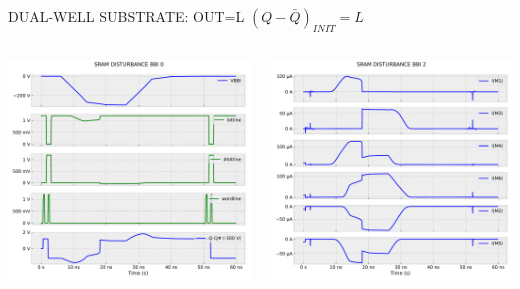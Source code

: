 
\begin{frame}{DUAL-WELL SUBSTRATE: OUT=L}
	\vspace{5mm}
	$(Q-\bar{Q})_{INIT}=L$
	\vspace{5mm}
	\begin{columns}
		\begin{column}{0.5\textwidth}
			\centering
			\includegraphics[width=\textwidth]{./figures/SRAMBBI0-300DW_q0.pdf}
		\end{column}
		\begin{column}{0.5\textwidth}
			\centering
			\includegraphics[width=\textwidth]{./figures/SRAMBBI2-300DW_q0.pdf}
		\end{column}
	\end{columns}
\end{frame}
